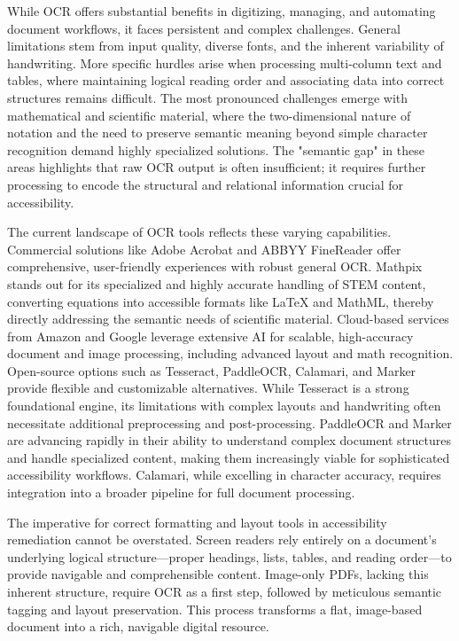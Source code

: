 While OCR offers substantial benefits in digitizing, managing, and automating document workflows, it faces persistent and complex challenges. General limitations stem from input quality, diverse fonts, and the inherent variability of handwriting. More specific hurdles arise when processing multi-column text and tables, where maintaining logical reading order and associating data into correct structures remains difficult. The most pronounced challenges emerge with mathematical and scientific material, where the two-dimensional nature of notation and the need to preserve semantic meaning beyond simple character recognition demand highly specialized solutions. The "semantic gap" in these areas highlights that raw OCR output is often insufficient; it requires further processing to encode the structural and relational information crucial for accessibility.

The current landscape of OCR tools reflects these varying capabilities. Commercial solutions like Adobe Acrobat and ABBYY FineReader offer comprehensive, user-friendly experiences with robust general OCR. Mathpix stands out for its specialized and highly accurate handling of STEM content, converting equations into accessible formats like LaTeX and MathML, thereby directly addressing the semantic needs of scientific material. Cloud-based services from Amazon and Google leverage extensive AI for scalable, high-accuracy document and image processing, including advanced layout and math recognition. Open-source options such as Tesseract, PaddleOCR, Calamari, and Marker provide flexible and customizable alternatives. While Tesseract is a strong foundational engine, its limitations with complex layouts and handwriting often necessitate additional preprocessing and post-processing. PaddleOCR and Marker are advancing rapidly in their ability to understand complex document structures and handle specialized content, making them increasingly viable for sophisticated accessibility workflows. Calamari, while excelling in character accuracy, requires integration into a broader pipeline for full document processing.

The imperative for correct formatting and layout tools in accessibility remediation cannot be overstated. Screen readers rely entirely on a document's underlying logical structure—proper headings, lists, tables, and reading order—to provide navigable and comprehensible content. Image-only PDFs, lacking this inherent structure, require OCR as a first step, followed by meticulous semantic tagging and layout preservation. This process transforms a flat, image-based document into a rich, navigable digital resource.

